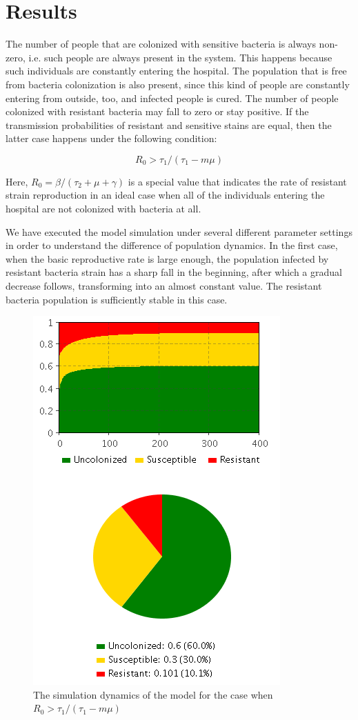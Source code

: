 \chapter{Results}


The number of people that are colonized with sensitive bacteria is always non-zero, i.e. such people are always present in the system. This happens because such individuals are constantly entering the hospital. The population that is free from bacteria colonization is also present, since this kind of people are constantly entering from outside, too, and infected people is cured. The number of people colonized with resistant bacteria may fall to zero or stay positive. If the transmission probabilities of resistant and sensitive stains are equal, then the latter case happens under the following condition:

\begin{equation}
R_0 > \tau_1/(\tau_1 - m \mu)
\end{equation}

Here, $R_0 = \beta/(\tau_2 + \mu + \gamma)$ is a special value that indicates the rate of resistant strain reproduction in an ideal case when all of the individuals entering the hospital are not colonized with bacteria at all.

We have executed the model simulation under several different parameter settings in order to understand the difference of population dynamics. In the first case, when the basic reproductive rate is large enough, the population infected by resistant bacteria strain has a sharp fall in the beginning, after which a gradual decrease follows, transforming into an almost constant value. The resistant bacteria population is sufficiently stable in this case.

\begin{figure}[H]
  \centering
  \includegraphics[height=0.7\textwidth]{img/screens/result/result1}
  \caption{The simulation dynamics of the model for the case when $R_0 > \tau_1/(\tau_1 - m \mu)$}
\end{figure}

